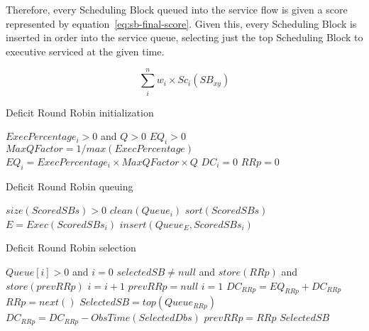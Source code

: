 Therefore, every Scheduling Block queued into the service flow is given a score represented by equation~\ref{eq:sb-final-score}. Given this, every Scheduling Block is inserted in order into the service queue, selecting just the top Scheduling Block to executive serviced at the given time.

\begin{equation}
\label{eq:sb-final-score}
\sum_{i}^{n} w_i\times Sc_i(SB_{xy})
\end{equation}

\begin{algorithm}                     
\caption{Deficit Round Robin initialization}          
\label{alg:drr-init}                   
\begin{algorithmic}                    
    \REQUIRE $ExecPercentage_i > 0$ and $Q > 0$
    \ENSURE $EQ_i > 0$
    \STATE $MaxQFactor = 1 / max(ExecPercentage)$
    \STATE $EQ_i = ExecPercentage_i\times MaxQFactor \times Q$
    \STATE $DC_i = 0$ 
    \STATE $RRp = 0$ 
    \ENDFOR
\end{algorithmic}
\end{algorithm}

\begin{algorithm}                     
\caption{Deficit Round Robin queuing}          
\label{alg:drr-queuing}                   
\begin{algorithmic}                    
    \REQUIRE $size(ScoredSBs) > 0$
    \STATE $clean(Queue_i)$
    \ENDFOR
    \STATE $sort(ScoredSBs)$
    \STATE $E = Exec(ScoredSBs_i)$
    \STATE $insert(Queue_E, ScoredSBs_i)$
    \ENDFOR
\end{algorithmic}
\end{algorithm}

\begin{algorithm}                     
\caption{Deficit Round Robin selection}          
\label{alg:drr-select}                   
\begin{algorithmic}                    
    \REQUIRE $Queue[i] > 0$ and $i = 0$
    \ENSURE $selectedSB \neq null$ and $store(RRp)$ and $store(prevRRp)$
    \REPEAT
    \STATE $i = i + 1$
    \STATE $prevRRp = null$
    \STATE $i = 1$
    \ENDIF
    \STATE $DC_{RRp} = EQ_{RRp} + DC_{RRp}$
    \ENDIF
    \STATE  $RRp = next()$
    \ENDIF
    \STATE $SelectedSB = top(Queue_{RRp})$
    \STATE $DC_{RRp} = DC_{RRp} - ObsTime(SelectedDbs)$
    \STATE $prevRRp = RRp$
    \ENDIF
    \RETURN  $SelectedSB$
\end{algorithmic}
\end{algorithm}

